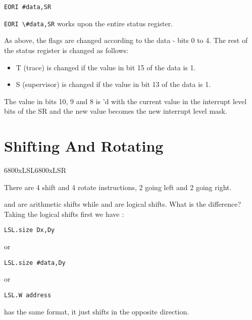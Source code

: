 \begin{lstlisting}[firstnumber=1,]
          EORI #data,SR
\end{lstlisting}

\lstinline{EORI \#data,SR} works upon the entire status register.

As above, the flags are changed according to the data -{} bits 0 to 4.
    The rest of the status register is changed as follows:
\begin{itemize}[itemsep=0pt]

\item{}T (trace) is changed if the value in bit 15 of the data is
        1.


\item{}S (supervisor) is changed if the value in bit 13 of the data is
        1.

\end{itemize}

The value in bits 10, 9 and 8 is 'd with the current value in the
    interrupt level bits of the SR and the new value becomes the new interrupt
    level mask.

\section{Shifting And Rotating}\mc6800x{LSL}\mc6800x{LSR}
\label{ch4-shift-rotate}%

There are 4 shift and 4 rotate instructions, 2 going left and 2
    going right.

 and  are arithmetic shifts while  and  are logical shifts. What is the difference? Taking the logical shifts first we have
   :

\begin{lstlisting}[firstnumber=1,]
          LSL.size Dx,Dy
\end{lstlisting}

or

\begin{lstlisting}[firstnumber=1,]
          LSL.size #data,Dy
\end{lstlisting}

or

\begin{lstlisting}[firstnumber=1,]
          LSL.W address
\end{lstlisting}

 has the same format, it just shifts in the opposite direction.
 

